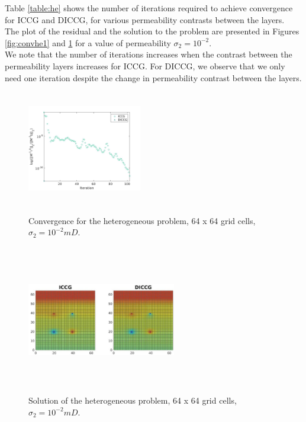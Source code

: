 \documentclass[12pt]{article}
\begin{document}
 Table \ref{table:he} shows the number of iterations required to achieve convergence 
for ICCG and DICCG, for various permeability contrasts between the layers. \\
The plot of the residual and the solution 
to the problem are presented in Figures \ref{fig:convhe1} and \ref{fig:solhe1} for a value of permeability $\sigma_2=10^{-2}$.\\
We note that the number of 
iterations increases when the contrast between the permeability layers increases for ICCG. For DICCG, 
we observe that we only need one iteration despite the change in permeability contrast between the layers.
\begin{figure}[!h]
\centering
\begin{minipage}{.4\textwidth}
 \centering
\includegraphics[width=5cm,height=5cm,keepaspectratio]
{conv_4w.jpg}
\caption{Convergence for the heterogeneous problem, 64 x 64 grid cells,  $\sigma_2=10^{-2}mD$.}
\label{fig:convhe1}
\end{minipage}%
\hspace{10pt}
\begin{minipage}{.4\textwidth} 
\centering 
\includegraphics[width=6.5cm,height=6.5cm,keepaspectratio]
{sol_4w.jpg}
\caption{Solution of the heterogeneous problem, 64 x 64 grid cells, $\sigma_2=10^{-2}mD$.}
\label{fig:solhe1}
\end{minipage}
\end{figure}
\end{document}
